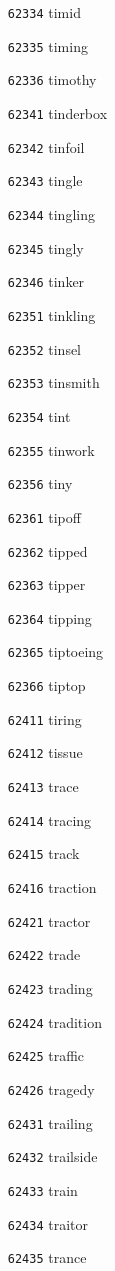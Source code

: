 \documentclass[twoside,11pt]{article}
\begin{document}
\begin{multicols}{5}
\begin{enumerate}
\item[\texttt{62334}] timid
\item[\texttt{62335}] timing
\item[\texttt{62336}] timothy
\item[\texttt{62341}] tinderbox
\item[\texttt{62342}] tinfoil
\item[\texttt{62343}] tingle
\item[\texttt{62344}] tingling
\item[\texttt{62345}] tingly
\item[\texttt{62346}] tinker
\item[\texttt{62351}] tinkling
\item[\texttt{62352}] tinsel
\item[\texttt{62353}] tinsmith
\item[\texttt{62354}] tint
\item[\texttt{62355}] tinwork
\item[\texttt{62356}] tiny
\item[\texttt{62361}] tipoff
\item[\texttt{62362}] tipped
\item[\texttt{62363}] tipper
\item[\texttt{62364}] tipping
\item[\texttt{62365}] tiptoeing
\item[\texttt{62366}] tiptop
\item[\texttt{62411}] tiring
\item[\texttt{62412}] tissue
\item[\texttt{62413}] trace
\item[\texttt{62414}] tracing
\item[\texttt{62415}] track
\item[\texttt{62416}] traction
\item[\texttt{62421}] tractor
\item[\texttt{62422}] trade
\item[\texttt{62423}] trading
\item[\texttt{62424}] tradition
\item[\texttt{62425}] traffic
\item[\texttt{62426}] tragedy
\item[\texttt{62431}] trailing
\item[\texttt{62432}] trailside
\item[\texttt{62433}] train
\item[\texttt{62434}] traitor
\item[\texttt{62435}] trance

\end{enumerate}
\end{multicols}
\end{document}
